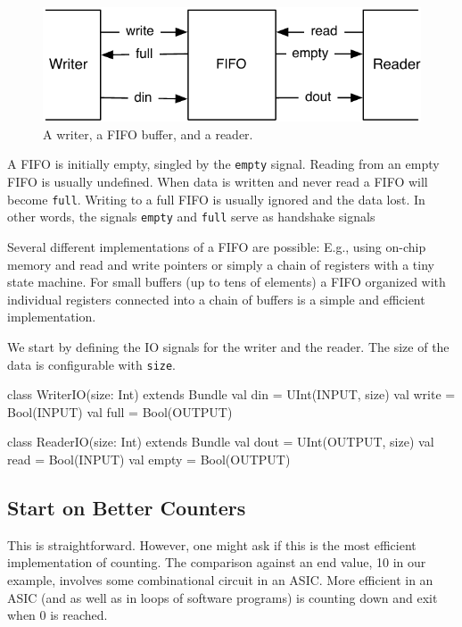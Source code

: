 \documentclass[%
    10pt, %
    headinclude, footexclude,
    openright, %
    notitlepage,
    cleardoubleempty,
    headsepline,
    pointlessnumbers,
    bibtotoc, idxtotoc,
    ]{scrbook}
\newcommand{\code}[1]{{\small{\texttt{#1}}}}
\newcommand{\scale}{0.7}
\begin{document}
\begin{figure}
  \centering
  \includegraphics[scale=\scale]{figures/fifo}
  \caption{A writer, a FIFO buffer, and a reader.}
  \label{fig:fifo}
\end{figure}

A FIFO is initially empty, singled by the \code{empty} signal. Reading
from an empty FIFO is usually undefined. When data is written and never
read a FIFO will become \code{full}. Writing to a full FIFO is usually ignored
and the data lost. In other words, the signals \code{empty} and \code{full}
serve as handshake signals 

Several different implementations of a FIFO are possible: E.g., using on-chip
memory and read and write pointers or simply a chain of registers with a
tiny state machine. For small buffers (up to tens of elements) a FIFO organized
with individual registers connected into a chain of buffers is a simple and efficient
implementation.

We start by defining the IO signals for the writer and the reader. The size of
the data is configurable with \code{size}.

\begin{chisel}
class WriterIO(size: Int) extends Bundle {
  val din = UInt(INPUT, size)
  val write = Bool(INPUT)
  val full = Bool(OUTPUT)
}

class ReaderIO(size: Int) extends Bundle {
  val dout = UInt(OUTPUT, size)
  val read = Bool(INPUT)
  val empty = Bool(OUTPUT)
}
\end{chisel}

\subsection*{Start on Better Counters}

This is straightforward. However, one might ask if this is the most efficient
implementation of counting. The comparison against an end value, 10 in our
example, involves some combinational circuit in an ASIC. More efficient in an
ASIC (and as well as in loops of software programs) is counting down and exit when 0
is reached.
\end{document}
